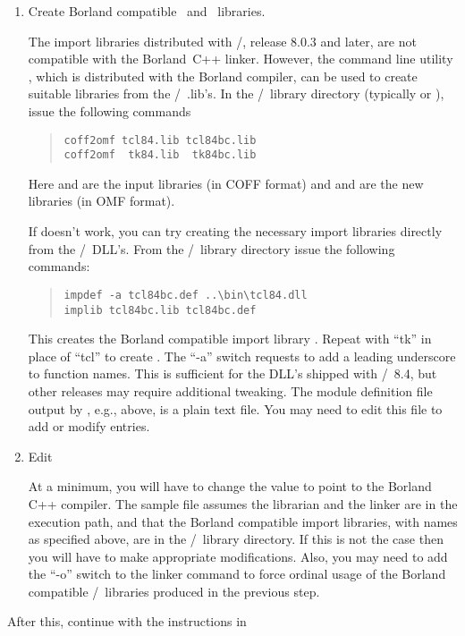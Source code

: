 \begin{enumerate}
\item Create Borland compatible \Tcl\ and \Tk\ libraries.

The import libraries distributed with \Tcl/\Tk, release 8.0.3 and later,
are not compatible with the Borland~C++ linker.  However, the command
line utility , which is distributed with
the Borland compiler, can be used to create suitable libraries from
the \Tcl/\Tk\ .lib's.  In the \Tcl/\Tk\ library directory (typically
 or ),
issue the following commands
\begin{quote}
\begin{verbatim}
coff2omf tcl84.lib tcl84bc.lib
coff2omf  tk84.lib  tk84bc.lib
\end{verbatim}
\end{quote}
Here  and  are the input libraries (in COFF
format) and  and  are the new libraries
(in OMF format).

If  doesn't work, you can try creating the necessary import
libraries directly from the \Tcl/\Tk\ DLL's.  From the \Tcl/\Tk\ library
directory issue the following commands:
\begin{quote}
\begin{verbatim}
impdef -a tcl84bc.def ..\bin\tcl84.dll
implib tcl84bc.lib tcl84bc.def
\end{verbatim}
\end{quote}
This creates the Borland compatible import library .
Repeat with ``tk'' in place of ``tcl'' to create .  The
``-a'' switch requests  to add a leading underscore to
function names.  This is sufficient for the DLL's shipped with \Tcl/\Tk\
8.4, but other releases may require additional tweaking.  The module
definition file output by \fn{impdef}, e.g., \fn{tcl84bc.def} above,
is a plain text file.  You may need to edit this file to add or modify
entries.


\item Edit 

At a minimum, you will have to change the 
value to point to the Borland C++ compiler.  The sample 
file assumes the librarian \fn{tlib} and the linker \fn{ilink32}
are in the execution path, and that the Borland compatible import
libraries, with names as specified above, are in the \Tcl/\Tk\ library
directory.  If this is not the case then you will have to make
appropriate modifications.  Also, you may need to add the ``-o'' switch
to the linker command to force ordinal usage of the Borland compatible
\Tcl/\Tk\ libraries produced in the previous step.

\end{enumerate}
After this, continue with the instructions in 
 


